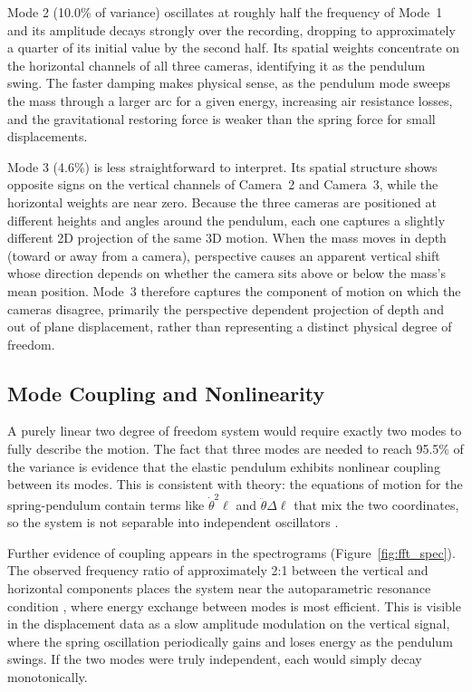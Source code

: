 \documentclass[12pt,a4paper]{article}
\begin{document}
Mode 2 (10.0\% of variance) oscillates at roughly half the frequency of Mode~1 and its amplitude decays strongly over the recording, dropping to approximately a quarter of its initial value by the second half. Its spatial weights concentrate on the horizontal channels of all three cameras, identifying it as the pendulum swing. The faster damping makes physical sense, as the pendulum mode sweeps the mass through a larger arc for a given energy, increasing air resistance losses, and the gravitational restoring force is weaker than the spring force for small displacements.

Mode 3 (4.6\%) is less straightforward to interpret. Its spatial structure shows opposite signs on the vertical channels of Camera~2 and Camera~3, while the horizontal weights are near zero. Because the three cameras are positioned at different heights and angles around the pendulum, each one captures a slightly different 2D projection of the same 3D motion. When the mass moves in depth (toward or away from a camera), perspective causes an apparent vertical shift whose direction depends on whether the camera sits above or below the mass's mean position. Mode~3 therefore captures the component of motion on which the cameras disagree, primarily the perspective dependent projection of depth and out of plane displacement, rather than representing a distinct physical degree of freedom.

\subsection{Mode Coupling and Nonlinearity}

A purely linear two degree of freedom system would require exactly two modes to fully describe the motion. The fact that three modes are needed to reach 95.5\% of the variance is evidence that the elastic pendulum exhibits nonlinear coupling between its modes. This is consistent with theory: the equations of motion for the spring-pendulum contain terms like $\dot{\theta}^2 \ell$ and $\ddot{\theta}\Delta\ell$ that mix the two coordinates, so the system is not separable into independent oscillators \citep{nayfeh1979}.

Further evidence of coupling appears in the spectrograms (Figure~\ref{fig:fft_spec}). The observed frequency ratio of approximately 2:1 between the vertical and horizontal components places the system near the autoparametric resonance condition \citep{lynch2002}, where energy exchange between modes is most efficient. This is visible in the displacement data as a slow amplitude modulation on the vertical signal, where the spring oscillation periodically gains and loses energy as the pendulum swings. If the two modes were truly independent, each would simply decay monotonically.
\end{document}
